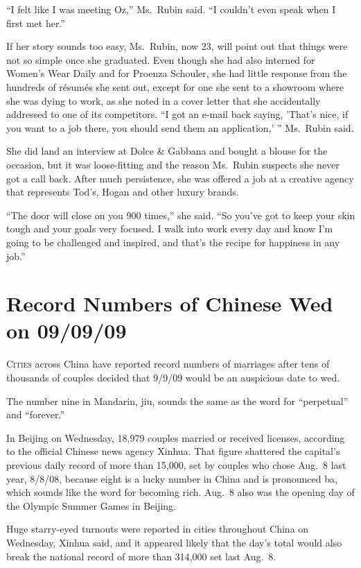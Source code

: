﻿\documentclass[12pt]{article}
\begin{document}
``I felt like I was meeting Oz,'' Ms.~Rubin said. ``I couldn't even speak when I first met her.''

If her story sounds too easy, Ms.~Rubin, now 23, will point out that things were not so simple once
she graduated. Even though she had also interned for Women's Wear Daily and for Proenza Schouler,
she had little response from the hundreds of r\'esum\'es she sent out, except for one she sent to a
showroom where she was dying to work, as she noted in a cover letter that she accidentally addressed
to one of its competitors. ``I got an e-mail back saying, 'That's nice, if you want to a job there,
you should send them an application,' '' Ms.~Rubin said.

She did land an interview at Dolce \& Gabbana and bought a blouse for the occasion, but it was
loose-fitting and the reason Ms.~Rubin suspects she never got a call back. After much persistence,
she was offered a job at a creative agency that represents Tod's, Hogan and other luxury brands.

``The door will close on you 900 times,'' she said. ``So you've got to keep your skin tough and your
goals very focused. I walk into work every day and know I'm going to be challenged and inspired, and
that's the recipe for happiness in any job.''

\section{Record Numbers of Chinese Wed on 09/09/09}

\lettrine{C}{ities} across China have reported record numbers of marriages after tens of thousands
of couples decided that 9/9/09 would be an auspicious date to wed.

The number nine in Mandarin, jiu, sounds the same as the word for ``perpetual'' and ``forever.''

In Beijing on Wednesday, 18,979 couples married or received licenses, according to the official
Chinese news agency Xinhua. That figure shattered the capital's previous daily record of more than
15,000, set by couples who chose Aug.~8 last year, 8/8/08, because eight is a lucky number in China
and is pronounced ba, which sounds like the word for becoming rich. Aug.~8 also was the opening day
of the Olympic Summer Games in Beijing.

Huge starry-eyed turnouts were reported in cities throughout China on Wednesday, Xinhua said, and it
appeared likely that the day's total would also break the national record of more than 314,000 set
last Aug.~8.
\end{document}
